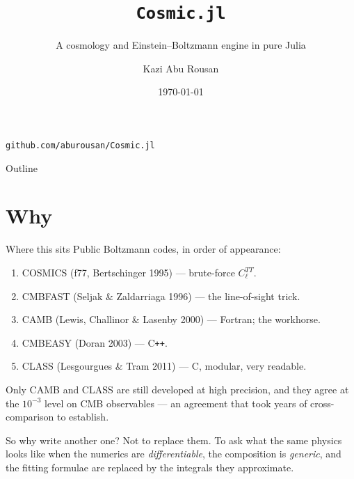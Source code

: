 \documentclass[10pt,aspectratio=43]{beamer}
\title[Cosmic.jl]{\texttt{Cosmic.jl}}
\subtitle{A cosmology and Einstein--Boltzmann engine in pure Julia}
\author{Kazi Abu Rousan}
\date{\today}
\newcommand{\cl}{C_\ell}
\begin{document}
{
\begin{frame}[plain]
  \titlepage
  \begin{center}
    \small\textcolor{cdeep}{\texttt{github.com/aburousan/Cosmic.jl}}
  \end{center}
\end{frame}}

\begin{frame}{Outline}
  \tableofcontents
\end{frame}

\section{Why}

\begin{frame}{Where this sits}
  Public Boltzmann codes, in order of appearance:
  \begin{enumerate}
    \item \textcolor{cdeep}{COSMICS} (f77, Bertschinger 1995) --- brute-force $\cl^{TT}$.
    \item \textcolor{cdeep}{CMBFAST} (Seljak \& Zaldarriaga 1996) --- the line-of-sight trick.
    \item \textcolor{cdeep}{CAMB} (Lewis, Challinor \& Lasenby 2000) --- Fortran; the workhorse.
    \item \textcolor{cdeep}{CMBEASY} (Doran 2003) --- C\texttt{++}.
    \item \textcolor{cdeep}{CLASS} (Lesgourgues \& Tram 2011) --- C, modular, very readable.
  \end{enumerate}
  \vfill
  Only CAMB and CLASS are still developed at high precision, and they agree at
  the $10^{-3}$ level on CMB observables --- an agreement that took years of
  cross-comparison to establish.
  \vfill
  \begin{block}{So why write another one?}
    Not to replace them. To ask what the same physics looks like when the
    numerics are \emph{differentiable}, the composition is \emph{generic}, and
    the fitting formulae are replaced by the integrals they approximate.
  \end{block}
\end{frame}
\end{document}

